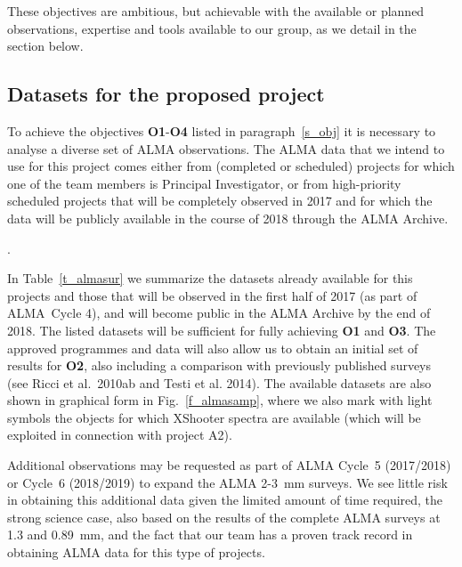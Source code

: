 \documentclass[10pt,fleqn,twoside]{article}
\begin{document}
These objectives are ambitious, but achievable with the available or planned observations, expertise and tools available to our group, as we detail in the section below.

\subsection{Datasets for the proposed project}
\label{s_data}

To achieve the objectives {\bf O1}-{\bf O4} listed in paragraph~\ref{s_obj} it is necessary to analyse a diverse set of ALMA observations. The ALMA data that we intend to use for this project comes either from (completed or scheduled) projects for which one of the team members is Principal Investigator, or from high-priority scheduled projects that will be completely observed in 2017 and for which the data will be publicly available in the course of 2018 through the ALMA Archive.

\vspace{1em}{\Tcol\bf ALMA Data for objectives O1, O2, and O3}.

In Table~\ref{t_almasur} we summarize the datasets already available for this projects and those that will be observed in the first half of 2017 (as part of ALMA~Cycle 4), and will become public in the ALMA Archive by the end of 2018. The listed datasets will be sufficient for fully achieving {\bf O1} and {\bf O3}. The approved programmes and data will also allow us to obtain an initial set of results for {\bf O2}, also including a comparison with previously published surveys (see Ricci et al.~2010ab and Testi et al. 2014).
The available datasets are also shown in graphical form in Fig.~\ref{f_almasamp}, where we also mark with light symbols the objects for which XShooter spectra are available (which will be exploited in connection with project A2).

Additional observations may be requested as part of ALMA Cycle~5 (2017/2018) or Cycle~6 (2018/2019) to expand the ALMA 2-3~mm surveys. We see little risk in obtaining this additional data given the limited amount of time required, the strong science case, also based on the results of the complete ALMA surveys at 1.3 and 0.89~mm, and the fact that our team has a proven track record in obtaining ALMA data for this type of projects.
\end{document}
